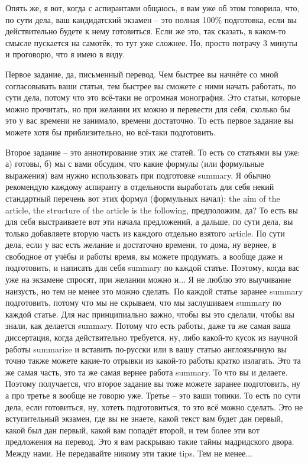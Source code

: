 \documentclass[main.tex]{subfiles}
\begin{document}
Опять же, я вот, когда с аспирантами общаюсь, я вам уже об этом говорила, что, по сути дела, ваш кандидатский экзамен -- это полная 100\% подготовка, если вы действительно будете к нему готовиться.
Если же это, так сказать, в каком-то смысле пускается на самотёк, то тут уже сложнее.
Но, просто потрачу 3 минуты и проговорю, что я имею в виду.

Первое задание, да, письменный перевод.
Чем быстрее вы начнёте со мной согласовывать ваши статьи, тем быстрее вы сможете с ними начать работать, по сути дела, потому что это всё-таки не огромная монография.
Это статьи, которые можно прочитать, но при желании их можно и перевести для себя, сколько бы это у вас времени не занимало, времени достаточно.
То есть первое задание вы можете хотя бы приблизительно, но всё-таки подготовить.

Второе задание -- это аннотирование этих же статей.
То есть со статьями вы уже: а) готовы, б) мы с вами обсудим, что какие формулы (или формульные выражения) вам нужно использовать при подготовке summary.
Я обычно рекомендую каждому аспиранту в отдельности выработать для себя некий стандартный перечень вот этих формул (формульных начал): the aim of the article, the structure of the article is the following, предположим, да?
То есть вы для себя выстраиваете вот эти начала предложений, а дальше, по сути дела, вы только добавляете вторую часть из каждого отдельно взятого article.
По сути дела, если у вас есть желание и достаточно времени, то дома, ну вернее, в свободное от учёбы и работы время, вы можете продумать, а вообще даже и подготовить, и написать для себя summary по каждой статье.
Поэтому, когда вас уже на экзамене спросят, при желании можно и...
Я не люблю это выучивание наизусть, но тем не менее это можно сделать.
По каждой статье заранее summary подготовить, потому что мы не скрываем, что мы заслушиваем summary по каждой статье.
Для нас принципиально важно, чтобы вы это сделали, чтобы вы знали, как делается summary.
Потому что есть работы, даже та же самая ваша диссертация, когда действительно требуется, ну, либо какой-то кусок из научной работы summarize и вставить по-русски или в вашу статью англоязычную вы точно также можете какие-то отрывки из какой-то работы кратко излагать.
Это та же самая часть, это та же самая вернее работа summary.
То что вы и делаете.
Поэтому получается, что второе задание вы тоже можете заранее подготовить, ну а про третье я вообще не говорю уже.
Третье -- это ваши топики.
То есть по сути дела, если готовиться, ну, хотеть подготовиться, то это всё можно сделать.
Это не вступительный экзамен, где вы не знаете, какой текст вам будет дан первый, какой был дан первый, какой вам попадёт второй, и тем более эти вот предложения на перевод.
Это я вам раскрываю такие тайны мадридского двора.
Между нами.
Не передавайте никому эти такие tips.
Тем не менее...
\end{document}
